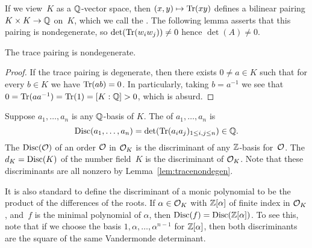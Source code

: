 If we view~$K$ as a $\mathbb{Q}$-vector space, then $(x,y)\mapsto \operatorname{Tr}(xy)$
defines a bilinear pairing $K\times K \to \mathbb{Q}$ on~$K$, which we call
the .  The following lemma asserts that this
pairing is nondegenerate, so $\det(\operatorname{Tr}(w_i w_j))\neq 0$ hence
$\det(A)\neq 0$.
\begin{lemma}\label{lem:tracenondegen}
The trace pairing is nondegenerate.
\end{lemma}
\begin{proof}
If the trace pairing is degenerate, then there exists $0\neq a\in K$ such
that for every $b\in K$ we have $\operatorname{Tr}(ab)=0$.  In particularly, taking
$b=a^{-1}$ we see that $0=\operatorname{Tr}(a a^{-1})=\operatorname{Tr}(1)=[K:\mathbb{Q}]>0$, which is
absurd.
\end{proof}

\begin{definition}[Discriminant]\label{def:disc}
Suppose $a_1,\ldots, a_n$ is any $\mathbb{Q}$-basis of $K$.  The 
of $a_1,\ldots, a_n$ is 
$$
  \operatorname{Disc}(a_1,\ldots,a_n) = \det(\operatorname{Tr}(a_i a_j)_{1\leq i,j\leq n})\in\mathbb{Q}.
$$
The  $\operatorname{Disc}(\mathcal{O})$ of an order $\mathcal{O}$ in $\mathcal{O}_K$ is
the discriminant of any $\mathbb{Z}$-basis for~$\mathcal{O}$.
The  $d_K=\operatorname{Disc}(K)$ of the number field~$K$ 
is the discriminant of $\mathcal{O}_K$. 
Note that these discriminants are all nonzero
by Lemma~\ref{lem:tracenondegen}.
\end{definition}

\begin{remark}
  It is also standard to define the discriminant of a monic polynomial
  to be the product of the differences of the roots.  If $\alpha\in
  \mathcal{O}_K$ with $\mathbb{Z}[\alpha]$ of finite index in $\mathcal{O}_K$, and~$f$ is the
  minimal polynomial of $\alpha$, then $\operatorname{Disc}(f)=\operatorname{Disc}(\mathbb{Z}[\alpha])$.
  To see this, note that if we choose the basis
  $1,\alpha,\ldots,\alpha^{n-1}$ for $\mathbb{Z}[\alpha]$, then both
  discriminants are the square of the same Vandermonde determinant.
\end{remark}

